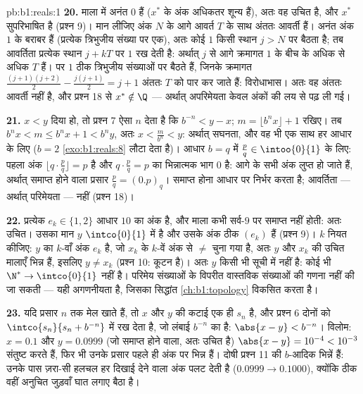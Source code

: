 \begin{solution}{pb:b1:reals:1}
\textbf{20.} माला में अनंत $0$ हैं ($x^*$ के अंक अधिकतर शून्य हैं), अतः वह
उचित है, और $x^*$ सुपरिभाषित है (प्रश्न 9)। मान लीजिए अंक $N$ के आगे आवर्त
$T$ के साथ अंततः आवर्ती हैं। अनंत अंक $1$ के बराबर हैं (प्रत्येक त्रिभुजीय
संख्या पर एक), अतः कोई $1$ किसी स्थान $j > N$ पर बैठता है; तब आवर्तिता
प्रत्येक स्थान $j + kT$ पर $1$ रख देती है: अर्थात् $j$ से आगे क्रमागत $1$ के
बीच के  अधिक से अधिक $T$ हैं। पर $1$ ठीक त्रिभुजीय संख्याओं पर बैठते
हैं, जिनके क्रमागत  $\frac{(j+1)(j+2)}{2} - \frac{j(j+1)}{2} = j + 1$
अंततः $T$ को पार कर जाते हैं: विरोधाभास। अतः वह अंततः आवर्ती नहीं है, और
प्रश्न 18 से $x^* \notin \Q$ --- अर्थात् अपरिमेयता केवल अंकों की लय से पढ़
ली गई।

\textbf{21.} $x < y$ दिया हो, तो प्रश्न 7 ऐसा $n$ देता है कि $b^{-n} < y -
x$; $m = \lfloor b^n x \rfloor + 1$ रखिए। तब $b^n x < m \leq b^n x + 1 < b^n
y$, अतः $x < \frac{m}{b^n} < y$: अर्थात् सघनता, और वह भी एक साथ हर आधार के
लिए ($b = 2$ \cref{exo:b1:reals:8} लौटा देता है)। आधार $b = q$ में $\frac pq
\in \intoo{0}{1}$ के लिए: पहला अंक $\lfloor q \cdot \frac pq \rfloor = p$ है
और $q \cdot \frac pq = p$ का भिन्नात्मक भाग $0$ है: आगे के सभी अंक लुप्त हो
जाते हैं, अर्थात् समाप्त होने वाला प्रसार $\frac pq = (0.p)_q$। समाप्त होना
आधार पर निर्भर करता है; आवर्तिता --- अर्थात् परिमेयता --- नहीं (प्रश्न 18)।

\textbf{22.} प्रत्येक $e_k \in \{1, 2\}$ आधार $10$ का अंक है, और माला कभी
सर्व-$9$ पर समाप्त नहीं होती: अतः उचित। उसका मान $y$ $\intco{0}{1}$ में है
और उसके अंक ठीक $(e_k)$ हैं (प्रश्न 9)। $k$ नियत कीजिए: $y$ का $k$-वाँ अंक
$e_k$ है, जो $x_k$ के $k$-वें अंक से $\neq$ चुना गया है, अतः $y$ और $x_k$ की
उचित मालाएँ भिन्न हैं, इसलिए $y \neq x_k$ (प्रश्न 10: कूटन  है)। अतः
$y$ किसी भी सूची में नहीं है: कोई भी  $\N^* \to \intco{0}{1}$
 नहीं है। परिमेय संख्याओं के विपरीत वास्तविक संख्याओं की गणना नहीं की
जा सकती --- यही अगणनीयता है, जिसका सिद्धांत \cref{ch:b1:topology} विकसित
करता है।

\textbf{23.} यदि प्रसार $n$ तक मेल खाते हैं, तो $x$ और $y$ की कटाई एक ही
$s_n$ है, और प्रश्न 6 दोनों को $\intco{s_n}{s_n + b^{-n}}$ में रख देता है,
जो लंबाई $b^{-n}$ का  है: $\abs{x - y} < b^{-n}$। विलोम: $x = 0.1$ और
$y = 0.0999$ (जो समाप्त होने वाला, अतः उचित है) $\abs{x - y} = 10^{-4} <
10^{-3}$ संतुष्ट करते हैं, फिर भी उनके प्रसार पहले ही अंक पर भिन्न हैं। दोषी
प्रश्न 11 की $b$-आदिक भिन्नें हैं: उनके पास ज़रा-सी हलचल हर दिखाई देने वाला
अंक पलट देती है ($0.0999 \to 0.1000$), क्योंकि ठीक वहीं अनुचित जुड़वाँ घात
लगाए बैठा है।


\end{solution}
